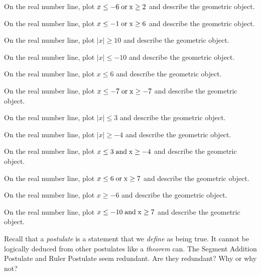 \documentclass[12pt]{article}
\newenvironment{problem}[2][Problem]{\begin{trivlist}
			\item[\hskip \labelsep {\bfseries #1}\hskip \labelsep {\bfseries #2.}]}{\end{trivlist}}
\begin{document}
			\begin{problem}{0} 
On the real number line, plot $ x \leq -6 \;\rm{ or }\; x \geq 2$ and describe the geometric object.
 \end{problem}\begin{problem}{1} 
On the real number line, plot $ x \leq -1 \;\rm{ or }\; x \geq 6$ and describe the geometric object.
 \end{problem}\begin{problem}{2} 
On the real number line, plot $\mid x\mid \geq 10$ and describe the geometric object.
 \end{problem}\begin{problem}{3} 
On the real number line, plot $\mid x\mid \leq -10$ and describe the geometric object.
 \end{problem}\begin{problem}{4} 
On the real number line, plot $x \leq 6$ and describe the geometric object.
 \end{problem}\begin{problem}{5} 
On the real number line, plot $ x \leq -7 \;\rm{ or }\; x \geq -7$ and describe the geometric object.
 \end{problem}\begin{problem}{6} 
On the real number line, plot $\mid x\mid \leq 3$ and describe the geometric object.
 \end{problem}\begin{problem}{7} 
On the real number line, plot $\mid x\mid \geq -4$ and describe the geometric object.
 \end{problem}\begin{problem}{8} 
On the real number line, plot $ x \leq 3 \;\rm{ and }\; x \geq -4$ and describe the geometric object.
 \end{problem}\begin{problem}{9} 
On the real number line, plot $ x \leq 6 \;\rm{ or }\; x \geq 7$ and describe the geometric object.
 \end{problem}\begin{problem}{10} 
On the real number line, plot $x \geq -6$ and describe the geometric object.
 \end{problem}\begin{problem}{11} 
On the real number line, plot $ x \leq -10 \;\rm{ and }\; x \geq 7$ and describe the geometric object.
 \end{problem}\begin{problem}{Challenge} 

	Recall that a \textit{postulate} is a statement that we \textit{define} as being true. It cannot
	be logically deduced from other postulates like a \textit{theorem} can.
	The Segment Addition Postulate and Ruler Postulate seem redundant. Are they redundant? Why or why not?
	
 \end{problem}
\end{document}
